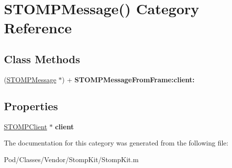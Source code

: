 \hypertarget{category_s_t_o_m_p_message_07_08}{}\section{S\+T\+O\+M\+P\+Message() Category Reference}
\label{category_s_t_o_m_p_message_07_08}
\subsection*{Class Methods}
\begin{DoxyCompactItemize}
\item 
(\hyperlink{interface_s_t_o_m_p_message}{S\+T\+O\+M\+P\+Message} $\ast$) + {\bfseries S\+T\+O\+M\+P\+Message\+From\+Frame\+:client\+:}\hypertarget{category_s_t_o_m_p_message_07_08_ae2528480518bc437ed7fa8bb09a6a71d}{}\label{category_s_t_o_m_p_message_07_08_ae2528480518bc437ed7fa8bb09a6a71d}

\end{DoxyCompactItemize}
\subsection*{Properties}
\begin{DoxyCompactItemize}
\item 
\hyperlink{interface_s_t_o_m_p_client}{S\+T\+O\+M\+P\+Client} $\ast$ {\bfseries client}\hypertarget{category_s_t_o_m_p_message_07_08_a040a6f348a435e65597a252473086015}{}\label{category_s_t_o_m_p_message_07_08_a040a6f348a435e65597a252473086015}

\end{DoxyCompactItemize}


The documentation for this category was generated from the following file\+:\begin{DoxyCompactItemize}
\item 
Pod/\+Classes/\+Vendor/\+Stomp\+Kit/Stomp\+Kit.\+m\end{DoxyCompactItemize}
